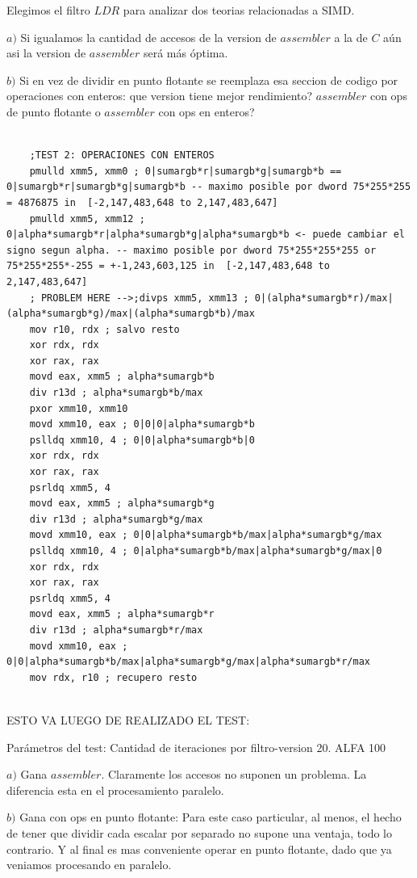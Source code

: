 Elegimos el filtro $LDR$ para analizar dos teorias relacionadas a SIMD. 

$a)$ Si igualamos la cantidad de accesos de la version de $assembler$ a la de $C$ aún asi la version de $assembler$ será más óptima.

$b)$ Si en vez de dividir en punto flotante se reemplaza esa seccion de codigo por operaciones con enteros: que version tiene mejor rendimiento? $assembler$ con ops de punto flotante o $assembler$ con ops en enteros?


\begin{codesnippet}
\begin{verbatim}

	;TEST 2: OPERACIONES CON ENTEROS
	pmulld xmm5, xmm0 ; 0|sumargb*r|sumargb*g|sumargb*b == 0|sumargb*r|sumargb*g|sumargb*b -- maximo posible por dword 75*255*255 = 4876875 in  [-2,147,483,648 to 2,147,483,647]
	pmulld xmm5, xmm12 ; 0|alpha*sumargb*r|alpha*sumargb*g|alpha*sumargb*b <- puede cambiar el signo segun alpha. -- maximo posible por dword 75*255*255*255 or 75*255*255*-255 = +-1,243,603,125 in  [-2,147,483,648 to 2,147,483,647]
	; PROBLEM HERE -->;divps xmm5, xmm13 ; 0|(alpha*sumargb*r)/max|(alpha*sumargb*g)/max|(alpha*sumargb*b)/max
    mov r10, rdx ; salvo resto
    xor rdx, rdx
    xor rax, rax
    movd eax, xmm5 ; alpha*sumargb*b
    div r13d ; alpha*sumargb*b/max
    pxor xmm10, xmm10
    movd xmm10, eax ; 0|0|0|alpha*sumargb*b
    pslldq xmm10, 4 ; 0|0|alpha*sumargb*b|0
    xor rdx, rdx
    xor rax, rax
    psrldq xmm5, 4
    movd eax, xmm5 ; alpha*sumargb*g
    div r13d ; alpha*sumargb*g/max
    movd xmm10, eax ; 0|0|alpha*sumargb*b/max|alpha*sumargb*g/max
    pslldq xmm10, 4 ; 0|alpha*sumargb*b/max|alpha*sumargb*g/max|0
    xor rdx, rdx
    xor rax, rax
    psrldq xmm5, 4
    movd eax, xmm5 ; alpha*sumargb*r
    div r13d ; alpha*sumargb*r/max
    movd xmm10, eax ; 0|0|alpha*sumargb*b/max|alpha*sumargb*g/max|alpha*sumargb*r/max
    mov rdx, r10 ; recupero resto
    
\end{verbatim}
\end{codesnippet}

ESTO VA LUEGO DE REALIZADO EL TEST:

Parámetros del test: 
Cantidad de iteraciones por filtro-version 20.
ALFA 100

$a)$ Gana $assembler$. Claramente los accesos no suponen un problema. La diferencia esta en el procesamiento paralelo.

$b)$ Gana con ops en punto flotante: Para este caso particular, al menos, el hecho de tener que dividir cada escalar por separado no supone una ventaja, todo lo contrario. Y al final es mas conveniente operar en punto flotante, dado que ya veniamos procesando en paralelo.
